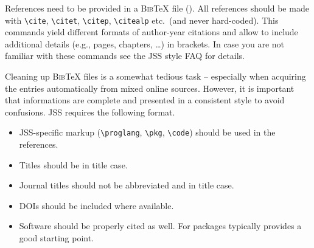 \documentclass[article]{jss}\usepackage{knitr}
\begin{document}
\begin{appendix}
\begin{leftbar}
References need to be provided in a \textsc{Bib}{\TeX} file (). All
references should be made with \verb|\cite|, \verb|\citet|, \verb|\citep|,
\verb|\citealp| etc.\ (and never hard-coded). This commands yield different
formats of author-year citations and allow to include additional details (e.g.,
pages, chapters, \dots) in brackets. In case you are not familiar with these
commands see the JSS style FAQ for details.

Cleaning up \textsc{Bib}{\TeX} files is a somewhat tedious task -- especially
when acquiring the entries automatically from mixed online sources. However,
it is important that informations are complete and presented in a consistent
style to avoid confusions. JSS requires the following format.
\begin{itemize}
  \item JSS-specific markup (\verb|\proglang|, \verb|\pkg|, \verb|\code|) should
    be used in the references.
  \item Titles should be in title case.
  \item Journal titles should not be abbreviated and in title case.
  \item DOIs should be included where available.
  \item Software should be properly cited as well. For  packages
     typically provides a good starting point.
\end{itemize}
\end{leftbar}

\end{appendix}

\end{document}
